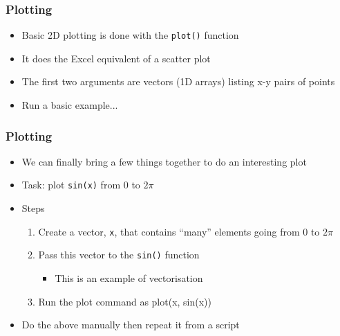 \documentclass[14pt]{beamer}
\begin{document}
\begin{frame}
\frametitle{Plotting}
\begin{itemize}
\item Basic 2D plotting is done with the \texttt{plot()} function
\item It does the Excel equivalent of a scatter plot
\item The first two arguments are vectors (1D arrays) listing x-y pairs of points
\item Run a basic example...
\end{itemize}
\end{frame}

\begin{frame}
\frametitle{Plotting}
\begin{itemize}
\item We can finally bring a few things together to do an interesting plot
\pause
\item Task: plot \texttt{sin(x)} from $0$ to $2\pi$
\item Steps
	\begin{enumerate}
		\item Create a vector, \texttt{x}, that contains ``many'' elements going from $0$ to $2\pi$
		\item Pass this vector to the \texttt{sin()} function
			\begin{itemize}
				\item This is an example of vectorisation
			\end{itemize}
		\item Run the plot command as plot(x, sin(x))
	\end{enumerate}
\item Do the above manually then repeat it from a script
\end{itemize}
\end{frame}
\end{document}
